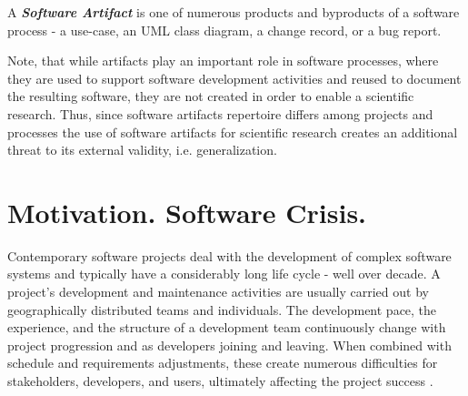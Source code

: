 \begin{defn}\label{def_artifact}
A \textbf{\textit{Software Artifact}} is one of numerous products and byproducts of a software process - 
a use-case, an UML class diagram, a change record, or a bug report. 
\end{defn}
Note, that while artifacts play an important role in software processes, where they are used to support 
software development activities and reused to document the resulting software, they are not created 
in order to enable a scientific research. Thus, since software artifacts repertoire differs among projects 
and processes the use of software artifacts for scientific research creates an additional threat to its 
external validity, i.e. generalization.


\newpage
%
%
\section{Motivation. Software Crisis.}\label{section_background}

Contemporary software projects deal with the development of complex software systems and typically have 
a considerably long life cycle - well over decade.
A project's development and maintenance activities are usually carried out by geographically 
distributed teams and individuals. The development pace, the experience, and the structure of a 
development team continuously change with project progression and as developers joining and leaving. 
When combined with schedule and requirements adjustments, these create numerous difficulties 
for stakeholders, developers, and users, ultimately affecting the project success \cite{citeulike:2207657}. 

